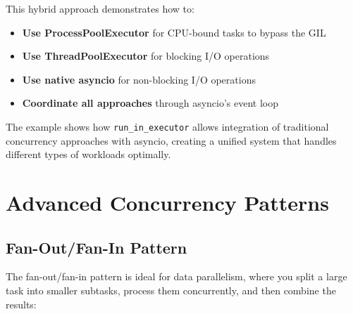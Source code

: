 \documentclass[12pt,letterpaper]{article}
\begin{document}
This hybrid approach demonstrates how to:

\begin{itemize}
    \item \textbf{\textcolor{pythonBlue}{Use ProcessPoolExecutor}} for CPU-bound tasks to bypass the GIL
    \item \textbf{\textcolor{pythonBlue}{Use ThreadPoolExecutor}} for blocking I/O operations 
    \item \textbf{\textcolor{pythonBlue}{Use native asyncio}} for non-blocking I/O operations
    \item \textbf{\textcolor{pythonBlue}{Coordinate all approaches}} through asyncio's event loop
\end{itemize}

The example shows how \texttt{run\_in\_executor} allows integration of traditional concurrency approaches with asyncio, creating a unified system that handles different types of workloads optimally.

\section{Advanced Concurrency Patterns}

\subsection{Fan-Out/Fan-In Pattern}

The fan-out/fan-in pattern is ideal for data parallelism, where you split a large task into smaller subtasks, process them concurrently, and then combine the results:
\end{document}
